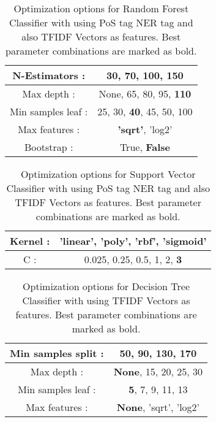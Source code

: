 \documentclass{article}
\begin{document}
\begin{thebibliography}{9}
\begin{table}
\centering
\begin{tabular}{|c|c|}
\hline
N-Estimators : & \textbf{30}, 70, 100, 150 \\
\hline
Max depth : & None, 65, 80, 95, \textbf{110} \\
\hline
Min samples leaf : & 25, 30, \textbf{40}, 45, 50, 100 \\
\hline
Max features : & \textbf{'sqrt'}, 'log2' \\
\hline
Bootstrap : & True, \textbf{False} \\
\hline
\end{tabular}
\caption{Optimization options for Random Forest Classifier with using PoS tag NER tag and also TFIDF Vectors as features. Best parameter combinations are marked as bold.}
\label{RandomForest-opt}
\end{table}


\begin{table}
\centering
\begin{tabular}{|c|c|}
\hline
Kernel : & \textbf{'linear'}, 'poly', 'rbf', 'sigmoid' \\
\hline
C : & 0.025, 0.25, 0.5, 1, 2, \textbf{3} \\
\hline
\end{tabular}
\caption{Optimization options for Support Vector Classifier with using PoS tag NER tag and also TFIDF Vectors as features. Best parameter combinations are marked as bold.}
\label{SVC-opt}
\end{table}

\begin{table}
\centering
\begin{tabular}{|c|c|}
\hline
Min samples split : & \textbf{50}, 90, 130, 170 \\
\hline
Max depth : & \textbf{None}, 15, 20, 25, 30 \\
\hline
Min samples leaf : & \textbf{5}, 7, 9, 11, 13 \\
\hline
Max features : & \textbf{None},  'sqrt', 'log2' \\
\hline
\end{tabular}
\caption{Optimization options for Decision Tree Classifier with using TFIDF Vectors as features. Best parameter combinations are marked as bold.}
\label{DecisionTree-opt-TFIDF}
\end{table}




\end{thebibliography}
\end{document}
